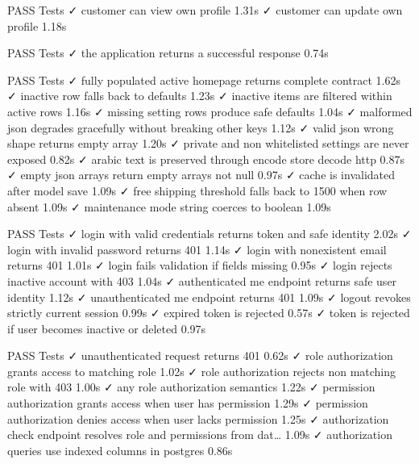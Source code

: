    PASS  Tests\Feature\CustomerProfileTest
  ✓ customer can view own profile                                        1.31s  
  ✓ customer can update own profile                                      1.18s  

   PASS  Tests\Feature\ExampleTest
  ✓ the application returns a successful response                        0.74s  

   PASS  Tests\Feature\HomepagePublicTest
  ✓ fully populated active homepage returns complete contract            1.62s  
  ✓ inactive row falls back to defaults                                  1.23s  
  ✓ inactive items are filtered within active rows                       1.16s  
  ✓ missing setting rows produce safe defaults                           1.04s  
  ✓ malformed json degrades gracefully without breaking other keys       1.12s  
  ✓ valid json wrong shape returns empty array                           1.20s  
  ✓ private and non whitelisted settings are never exposed               0.82s  
  ✓ arabic text is preserved through encode store decode http            0.87s  
  ✓ empty json arrays return empty arrays not null                       0.97s  
  ✓ cache is invalidated after model save                                1.09s  
  ✓ free shipping threshold falls back to 1500 when row absent           1.09s  
  ✓ maintenance mode string coerces to boolean                           1.09s  

   PASS  Tests\Feature\IdentityAuthenticationTest
  ✓ login with valid credentials returns token and safe identity         2.02s  
  ✓ login with invalid password returns 401                              1.14s  
  ✓ login with nonexistent email returns 401                             1.01s  
  ✓ login fails validation if fields missing                             0.95s  
  ✓ login rejects inactive account with 403                              1.04s  
  ✓ authenticated me endpoint returns safe user identity                 1.12s  
  ✓ unauthenticated me endpoint returns 401                              1.09s  
  ✓ logout revokes strictly current session                              0.99s  
  ✓ expired token is rejected                                            0.57s  
  ✓ token is rejected if user becomes inactive or deleted                0.97s  

   PASS  Tests\Feature\IdentityAuthorizationTest
  ✓ unauthenticated request returns 401                                  0.62s  
  ✓ role authorization grants access to matching role                    1.02s  
  ✓ role authorization rejects non matching role with 403                1.00s  
  ✓ any role authorization semantics                                     1.22s  
  ✓ permission authorization grants access when user has permission      1.29s  
  ✓ permission authorization denies access when user lacks permission    1.25s  
  ✓ authorization check endpoint resolves role and permissions from dat… 1.09s  
  ✓ authorization queries use indexed columns in postgres                0.86s  

